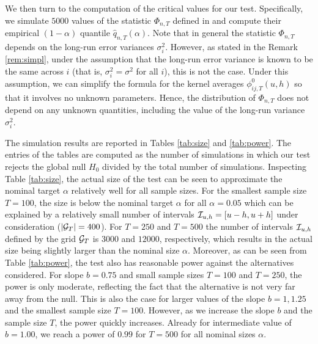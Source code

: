 \documentclass[a4paper,12pt]{article}
\makeatletter
\renewcommand{\eqref}[1]{\tagform@{\ref{#1}}}
\makeatother
\begin{document}
We then turn to the computation of the critical values for our test. Specifically, we simulate $5000$ values of the statistic $\Phi_{n,T}$ defined in \eqref{eq:Phi} and compute their empirical $(1-\alpha)$ quantile $\widehat{q}_{n,T}(\alpha)$. Note that in general the statistic $\Phi_{n,T}$ depends on the long-run error variances $\sigma_i^2$. However, as stated in the Remark \ref{rem:simpl}, under the assumption that the long-run error variance is known to be the same across $i$ (that is, $\sigma_i^2 = \sigma^2$ for all $i$), this is not the case. Under this assumption, we can simplify the formula for the kernel averages $\phi^0_{ij, T}(u, h)$ so that it involves no unknown parameters. Hence, the distribution of $\Phi_{n, T}$ does not depend on any unknown quantities, including the value of the long-run variance $\sigma_i^2$.

%
%

The simulation results are reported in Tables \ref{tab:size} and \ref{tab:power}. The entries of the tables are computed as the number of simulations in which our test rejects the global null $H_0$ divided by the total number of simulations. Inspecting Table \ref{tab:size}, the actual size of the test can be seen to approximate the nominal target $\alpha$ relatively well for all sample sizes. For the smallest sample size $T = 100$, the size is below the nominal target $\alpha$ for all $\alpha = 0.05$ which can be explained by a relatively small number of intervals $\mathcal{I}_{u, h} =[u-h, u+h]$ under consideration ($|\mathcal{G}_T| = 400$). For $T =250$ and $T=  500$ the number of intervals $\mathcal{I}_{u, h}$ defined by the grid $\mathcal{G}_T$ is $3000$ and $12000$, respectively, which results in the actual size being slightly larger than the nominal size $\alpha$. %
Moreover, as can be seen from Table \ref{tab:power}, the test also has reasonable power against the alternatives considered. For slope $b=0.75$ and small sample sizes $T = 100$ and $T = 250$, the power is only moderate, reflecting the fact that the alternative is not very far away from the null. This is also the case for larger values of the slope $b = 1, 1.25$ and the smallest sample size $T = 100$. However, as we increase the slope $b$ and the sample size $T$, the power quickly increases. Already for intermediate value of $b = 1.00$, we reach a power of $0.99$ for $T = 500$ for all nominal sizes $\alpha$.
\end{document}
